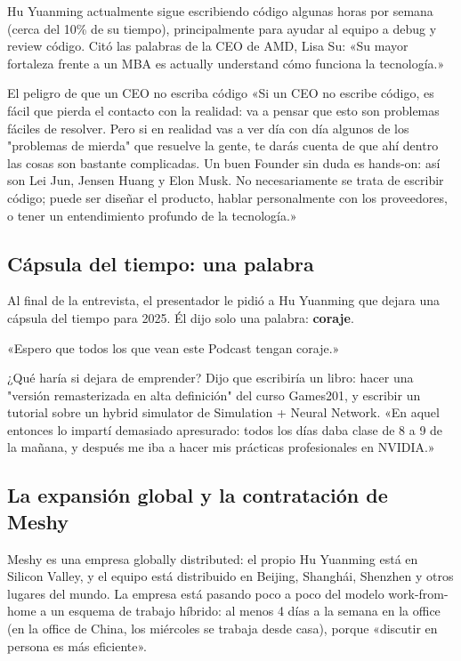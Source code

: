 \documentclass[a4paper]{article}
\begin{document}
Hu Yuanming actualmente sigue escribiendo código algunas horas por semana (cerca del 10\% de su tiempo), principalmente para ayudar al equipo a debug y review código. Citó las palabras de la CEO de AMD, Lisa Su: «Su mayor fortaleza frente a un MBA es actually understand cómo funciona la tecnología.»

\begin{warningbox}{El peligro de que un CEO no escriba código}
«Si un CEO no escribe código, es fácil que pierda el contacto con la realidad: va a pensar que esto son problemas fáciles de resolver. Pero si en realidad vas a ver día con día algunos de los "problemas de mierda" que resuelve la gente, te darás cuenta de que ahí dentro las cosas son bastante complicadas. Un buen Founder sin duda es hands-on: así son Lei Jun, Jensen Huang y Elon Musk. No necesariamente se trata de escribir código; puede ser diseñar el producto, hablar personalmente con los proveedores, o tener un entendimiento profundo de la tecnología.»
\end{warningbox}

\subsection{Cápsula del tiempo: una palabra}

Al final de la entrevista, el presentador le pidió a Hu Yuanming que dejara una cápsula del tiempo para 2025. Él dijo solo una palabra: \textbf{coraje}.

«Espero que todos los que vean este Podcast tengan coraje.»

¿Qué haría si dejara de emprender? Dijo que escribiría un libro: hacer una "versión remasterizada en alta definición" del curso Games201, y escribir un tutorial sobre un hybrid simulator de Simulation + Neural Network. «En aquel entonces lo impartí demasiado apresurado: todos los días daba clase de 8 a 9 de la mañana, y después me iba a hacer mis prácticas profesionales en NVIDIA.»

\subsection{La expansión global y la contratación de Meshy}

Meshy es una empresa globally distributed: el propio Hu Yuanming está en Silicon Valley, y el equipo está distribuido en Beijing, Shanghái, Shenzhen y otros lugares del mundo. La empresa está pasando poco a poco del modelo work-from-home a un esquema de trabajo híbrido: al menos 4 días a la semana en la office (en la office de China, los miércoles se trabaja desde casa), porque «discutir en persona es más eficiente».
\end{document}
